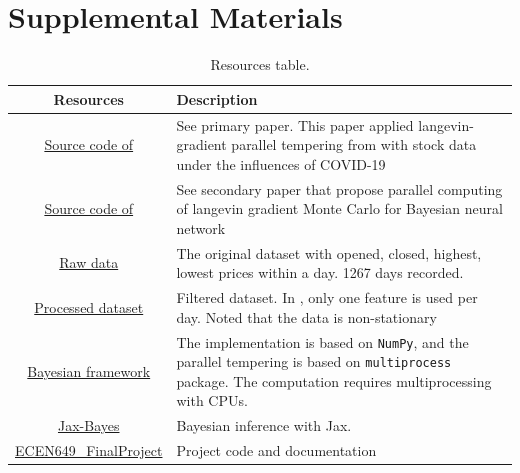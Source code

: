 \documentclass{article}
\begin{document}



\section{Supplemental Materials}

\begin{table}[h]
    \centering
    \begin{tabularx}{\textwidth}{cX}
       \textbf{Resources} & \textbf{Description} \\
       \hline
       \href{https://github.com/sydney-machine-learning/Bayesianneuralnet_stockmarket}{Source code  of \cite{chandra2021bayesian}} & See primary paper\cite{chandra2021bayesian}. This paper applied langevin-gradient parallel tempering from \cite{chandra2019langevin} with stock data under the influences of COVID-19\\\hline
       \href{https://github.com/sydney-machine-learning/parallel-tempering-neural-net}{Source code of \cite{chandra2019langevin}} & See secondary paper\cite{chandra2019langevin} that propose parallel computing of langevin gradient Monte Carlo for Bayesian neural network\\\hline
        \href{https://github.com/sydney-machine-learning/Bayesianneuralnet_stockmarket/blob/master/code/datasets/raw/DAI.DE.csv}{Raw data}  & The original dataset with opened, closed, highest, lowest prices within a day. 1267 days recorded.  \\\hline
       \href{https://github.com/sydney-machine-learning/Bayesianneuralnet_stockmarket/blob/master/code/datasets/600118.SS_1_train.txt}{Processed dataset}  & Filtered dataset. In \cite{chandra2021bayesian}, only one feature is used per day. Noted that the data is non-stationary  \\\hline
       \href{https://github.com/sydney-machine-learning/Bayesianneuralnet_stockmarket/blob/6d24cf25115b6517e3099249bc657674f6b9b98f/code/pt_timeseries_regression.py\#L36-L142}{Bayesian framework} & The implementation is based on \texttt{NumPy}, and the parallel tempering is based on \texttt{multiprocess} package. The computation requires multiprocessing with CPUs.\\
       \href{https://github.com/jamesvuc/jax-bayes}{Jax-Bayes} & Bayesian inference with Jax\cite{jax2018github}.\\\hline
       \href{https://github.com/stevengogogo/ECEN649_FinalProject}{ECEN649\_FinalProject} & Project code and documentation
    \end{tabularx}
    \caption{Resources table.}
    \label{tab:my_label}
\end{table}
\end{document}
